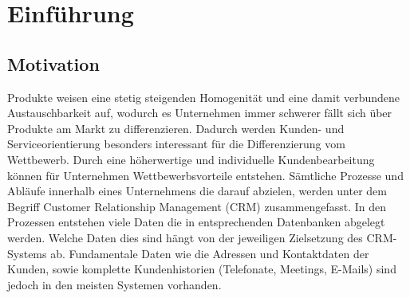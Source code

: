 \chapter{Einführung}
\label{ch:Einfuehrung}

\section{Motivation}
\label{ch:Einfuehrung:sec:Motivation}


Produkte weisen eine stetig steigenden Homogenität und eine damit verbundene Austauschbarkeit auf, wodurch es Unternehmen immer schwerer fällt sich über Produkte am Markt zu differenzieren. Dadurch werden Kunden- und Serviceorientierung besonders interessant für die Differenzierung vom Wettbewerb. Durch eine höherwertige und individuelle Kundenbearbeitung können für Unternehmen Wettbewerbsvorteile entstehen. Sämtliche Prozesse und Abläufe innerhalb eines Unternehmens die darauf abzielen, werden unter dem Begriff Customer Relationship Management (CRM) zusammengefasst. 
In den Prozessen entstehen viele Daten die in entsprechenden Datenbanken abgelegt werden. Welche Daten dies sind hängt von der jeweiligen Zielsetzung des CRM-Systems ab. Fundamentale Daten wie die Adressen und Kontaktdaten der Kunden, sowie komplette Kundenhistorien (Telefonate, Meetings, E-Mails) sind jedoch in den meisten Systemen vorhanden. 

